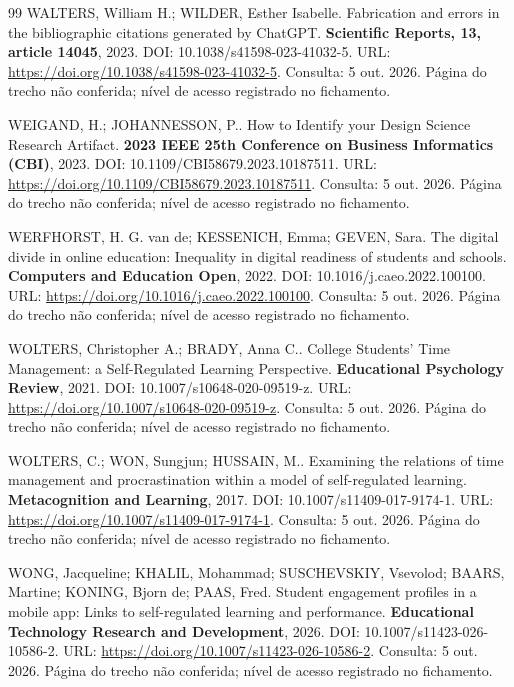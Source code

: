 \begin{thebibliography}{99}
 WALTERS, William H.; WILDER, Esther Isabelle. Fabrication and errors in the bibliographic citations generated by ChatGPT. \textbf{Scientific Reports, 13, article 14045}, 2023. DOI: 10.1038/s41598-023-41032-5. URL: \url{https://doi.org/10.1038/s41598-023-41032-5}. Consulta: 5 out. 2026. Página do trecho não conferida; nível de acesso registrado no fichamento.


 WEIGAND, H.; JOHANNESSON, P.. How to Identify your Design Science Research Artifact. \textbf{2023 IEEE 25th Conference on Business Informatics (CBI)}, 2023. DOI: 10.1109/CBI58679.2023.10187511. URL: \url{https://doi.org/10.1109/CBI58679.2023.10187511}. Consulta: 5 out. 2026. Página do trecho não conferida; nível de acesso registrado no fichamento.


 WERFHORST, H. G. van de; KESSENICH, Emma; GEVEN, Sara. The digital divide in online education: Inequality in digital readiness of students and schools. \textbf{Computers and Education Open}, 2022. DOI: 10.1016/j.caeo.2022.100100. URL: \url{https://doi.org/10.1016/j.caeo.2022.100100}. Consulta: 5 out. 2026. Página do trecho não conferida; nível de acesso registrado no fichamento.


 WOLTERS, Christopher A.; BRADY, Anna C.. College Students’ Time Management: a Self-Regulated Learning Perspective. \textbf{Educational Psychology Review}, 2021. DOI: 10.1007/s10648-020-09519-z. URL: \url{https://doi.org/10.1007/s10648-020-09519-z}. Consulta: 5 out. 2026. Página do trecho não conferida; nível de acesso registrado no fichamento.


 WOLTERS, C.; WON, Sungjun; HUSSAIN, M.. Examining the relations of time management and procrastination within a model of self-regulated learning. \textbf{Metacognition and Learning}, 2017. DOI: 10.1007/s11409-017-9174-1. URL: \url{https://doi.org/10.1007/s11409-017-9174-1}. Consulta: 5 out. 2026. Página do trecho não conferida; nível de acesso registrado no fichamento.


 WONG, Jacqueline; KHALIL, Mohammad; SUSCHEVSKIY, Vsevolod; BAARS, Martine; KONING, Bjorn de; PAAS, Fred. Student engagement profiles in a mobile app: Links to self-regulated learning and performance. \textbf{Educational Technology Research and Development}, 2026. DOI: 10.1007/s11423-026-10586-2. URL: \url{https://doi.org/10.1007/s11423-026-10586-2}. Consulta: 5 out. 2026. Página do trecho não conferida; nível de acesso registrado no fichamento.



\end{thebibliography}
